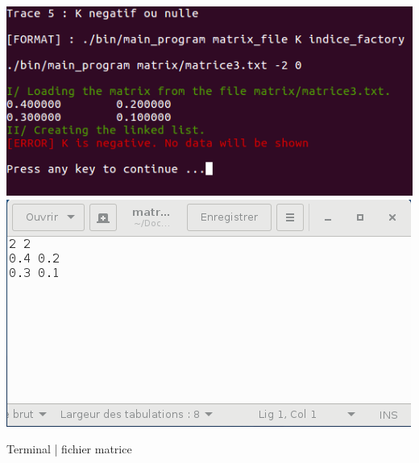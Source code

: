 \documentclass[a4paper]{article}
\begin{document}
\begin{center}
\includegraphics[scale=0.4]{trace_6.png}
\includegraphics[scale=0.4]{matrice_2.png}

Terminal | fichier matrice
\end{center}
\end{document}
